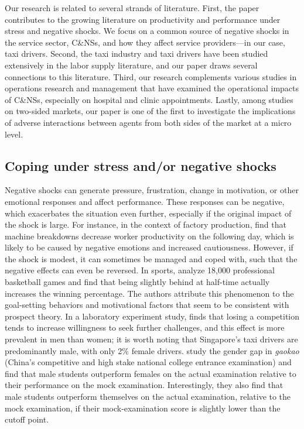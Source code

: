 \documentclass[reviewmode]{AEA}
\begin{document}
Our research is related to several strands of literature. First, the paper contributes to the growing literature on productivity and performance under stress and negative shocks. We focus on a common source of negative shocks in the service sector, C\&NSs, and how they affect service providers---in our case, taxi drivers. Second, the taxi industry and taxi drivers  have been studied extensively in the labor supply literature, and our paper draws several connections to this literature. Third, our research complements various studies in operations research and management that have examined the operational impacts of C\&NSs, especially on hospital and clinic appointments. Lastly, among studies on two-sided markets, our paper is one of the first to investigate the implications of adverse interactions between agents from both sides of the market at a micro level.


\subsection{Coping under stress and/or negative shocks}

Negative shocks can generate pressure, frustration, change in motivation, or other emotional responses and affect performance.  These responses can be negative, which exacerbates the situation even further, especially if the original impact of the shock is large. For instance, in the context of factory production, \citet{cai2017recover} find that machine breakdowns decrease worker productivity on the following day, which is likely to be caused by negative emotions and increased cautiousness. However, if the shock is modest, it can sometimes be managed and coped with, such that the negative effects can even be reversed. In sports, \citet{berger2011can} analyze 18,000 professional basketball games and find that being slightly behind at half-time actually increases the winning percentage. The authors attribute this phenomenon to the goal-setting behaviors and motivational factors that seem to be consistent with prospect theory. In a laboratory experiment study, \citet{buser2016impact}  finds that losing a competition tends to increase willingness to seek further challenges, and this effect is more prevalent in men than women; it is worth noting that Singapore's taxi drivers are predominantly male, with only 2\% female drivers. \citet{cai2016gender} study the gender gap in \emph{gaokao} (China's competitive and high stake national college entrance examination) and find that male students outperform females on the actual examination relative to their performance on the mock examination. Interestingly, they also find that male students outperform themselves on the actual examination, relative to the mock examination, if their mock-examination score is slightly lower than the cutoff point. 
\end{document}
